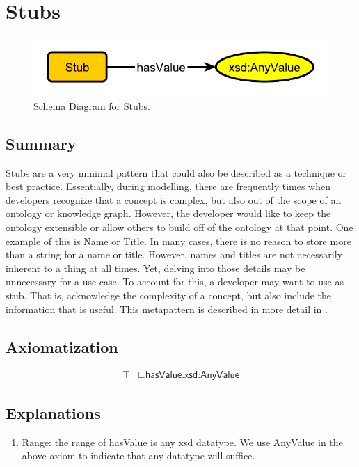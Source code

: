 \section{Stubs}
\label{sec:Stubs}
\begin{figure}[h!]
\begin{center}
\includegraphics[width=.4\textwidth]{figures/stubs}
\end{center}
\caption{Schema Diagram for Stubs.}
\label{fig:Stubs}
\end{figure}
\subsection{Summary}
\label{sum:Stubs}
Stubs are a very minimal pattern that could also be described as a technique or best practice. Essentially, during modelling, there are frequently times when developers recognize that a concept is complex, but also out of the scope of an ontology or knowledge graph. However, the developer would like to keep the ontology extensible or allow others to build off of the ontology at that point. One example of this is Name or Title. In many cases, there is no reason to store more than a string for a name or title. However, names and titles are not necessarily inherent to a thing at all times. Yet, delving into those details may be unnecessary for a use-case. To account for this, a developer may want to use as stub. That is, acknowledge the complexity of a concept, but also include the information that is useful. This metapattern is described in more detail in \cite{stub}. 

\subsection{Axiomatization}
\label{axs:Stubs}
\begin{align}
\top &\sqsubseteq \textsf{hasValue.xsd:AnyValue}
\end{align}

\subsection{Explanations}
\label{exp:Stubs}
\begin{enumerate}
\item Range: the range of \textsf{hasValue} is any xsd datatype. We use AnyValue in the above axiom to indicate that any datatype will suffice.
\end{enumerate}

